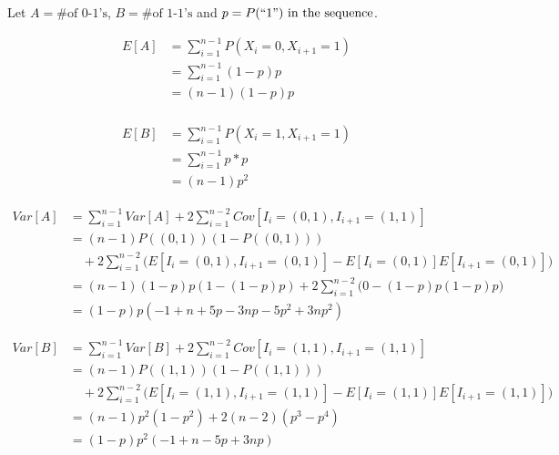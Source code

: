 \documentclass[12pt]{article}
\begin{document}
    Let \(A = \text{\# of 0-1's}\), \(B = \text{\# of 1-1's}\) and \(p = P(``1")
    \text{ in the sequence}\).

    \begin{equation*}
        \begin{split}
        E[A]& =\sum_{i=1}^{n-1}P(X_i=0,X_{i+1}=1) \\
            & =\sum_{i=1}^{n-1}(1-p)p \\
            & =(n-1)(1-p)p \\
        \end{split}
    \end{equation*}

    \begin{equation*}
        \begin{split}
        E[B]& =\sum_{i=1}^{n-1}P(X_i=1,X_{i+1}=1) \\
            & =\sum_{i=1}^{n-1}p*p \\
            & =(n-1)p^2
        \end{split}
    \end{equation*}

    \begin{equation*}
        \begin{split}
        Var[A]& =\sum_{i=1}^{n-1}Var[A]+2\sum_{i=1}^{n-2}Cov[I_i=(0,1),I_{i+1}=
                 (1,1)] \\
              & =(n-1)P((0,1))(1-P((0,1))) \\
              & \quad +2\sum_{i=1}^{n-2}\bigg(E[I_i=(0,1),I_{i+1}=(0,1)]-E[I_i=
                (0,1)]E[I_{i+1}=(0,1)]\bigg) \\
              & =(n-1)(1-p)p(1-(1-p)p)+2\sum_{i=1}^{n-2}\bigg(0-(1-p)p(1-p)p
                \bigg) \\
              & =(1-p)p(-1+n+5p-3np-5p^2+3np^2)
        \end{split}
    \end{equation*}

    \begin{equation*}
        \begin{split}
        Var[B]& =\sum_{i=1}^{n-1}Var[B]+2\sum_{i=1}^{n-2}Cov[I_i=(1,1),I_{i+1}=
                (1,1)] \\
              & =(n-1)P((1, 1))(1-P((1, 1))) \\
              & \quad +2\sum_{i=1}^{n-2}\bigg(E[I_i=(1,1),I_{i+1}=(1,1)]-E[I_i=
                (1,1)]E[I_{i+1}=(1,1)]\bigg) \\
              & =(n-1)p^2(1-p^2)+2(n-2)(p^3-p^4) \\
              & =(1-p)p^2(-1+n-5p+3np)
        \end{split}
    \end{equation*}
\end{document}
